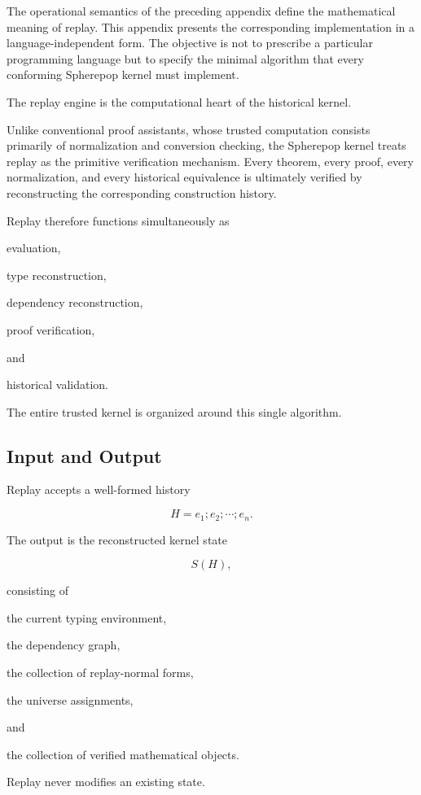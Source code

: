 \documentclass[12pt,oneside]{article}
\theoremstyle{definition}
\theoremstyle{remark}
\begin{document}
The operational semantics of the preceding appendix define the mathematical
meaning of replay. This appendix presents the corresponding implementation in a
language-independent form. The objective is not to prescribe a particular
programming language but to specify the minimal algorithm that every conforming
Spherepop kernel must implement.

The replay engine is the computational heart of the historical kernel.

Unlike conventional proof assistants, whose trusted computation consists
primarily of normalization and conversion checking, the Spherepop kernel treats
replay as the primitive verification mechanism. Every theorem, every proof,
every normalization, and every historical equivalence is ultimately verified by
reconstructing the corresponding construction history.

Replay therefore functions simultaneously as

evaluation,

type reconstruction,

dependency reconstruction,

proof verification,

and

historical validation.

The entire trusted kernel is organized around this single algorithm.


\subsection{Input and Output}

Replay accepts a well-formed history

\[
H
=
e_1;
e_2;
\cdots;
e_n.
\]

The output is the reconstructed kernel state

\[
S(H),
\]

consisting of

the current typing environment,

the dependency graph,

the collection of replay-normal forms,

the universe assignments,

and

the collection of verified mathematical objects.

Replay never modifies an existing state.
\end{document}
